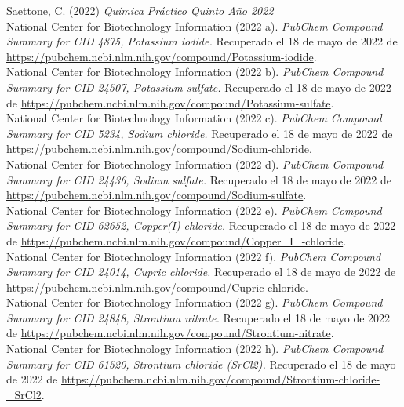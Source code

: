 \documentclass{article}
\begin{document}
Saettone, C. (2022) \textit{Química Práctico Quinto Año 2022}\\

National Center for Biotechnology Information (2022 a). \textit{PubChem Compound Summary for CID 4875, Potassium iodide.} Recuperado el 18 de mayo de 2022 de \url{https://pubchem.ncbi.nlm.nih.gov/compound/Potassium-iodide}.\\

National Center for Biotechnology Information (2022 b). \textit{PubChem Compound Summary for CID 24507, Potassium sulfate.} Recuperado el 18 de mayo de 2022 de \url{https://pubchem.ncbi.nlm.nih.gov/compound/Potassium-sulfate}.\\

National Center for Biotechnology Information (2022 c). \textit{PubChem Compound Summary for CID 5234, Sodium chloride.} Recuperado el 18 de mayo de 2022 de \url{https://pubchem.ncbi.nlm.nih.gov/compound/Sodium-chloride}.\\

National Center for Biotechnology Information (2022 d). \textit{PubChem Compound Summary for CID 24436, Sodium sulfate.} Recuperado el 18 de mayo de 2022 de \url{https://pubchem.ncbi.nlm.nih.gov/compound/Sodium-sulfate}.\\

National Center for Biotechnology Information (2022 e). \textit{PubChem Compound Summary for CID 62652, Copper(I) chloride.} Recuperado el 18 de mayo de 2022 de \url{https://pubchem.ncbi.nlm.nih.gov/compound/Copper_I_-chloride}.\\

National Center for Biotechnology Information (2022 f). \textit{PubChem Compound Summary for CID 24014, Cupric chloride.} Recuperado el 18 de mayo de 2022 de \url{https://pubchem.ncbi.nlm.nih.gov/compound/Cupric-chloride}.\\

National Center for Biotechnology Information (2022 g). \textit{PubChem Compound Summary for CID 24848, Strontium nitrate.} Recuperado el 18 de mayo de 2022 de \url{https://pubchem.ncbi.nlm.nih.gov/compound/Strontium-nitrate}.\\

National Center for Biotechnology Information (2022 h). \textit{PubChem Compound Summary for CID 61520, Strontium chloride (SrCl2).} Recuperado el 18 de mayo de 2022 de \url{https://pubchem.ncbi.nlm.nih.gov/compound/Strontium-chloride-_SrCl2}.\\
\end{document}
